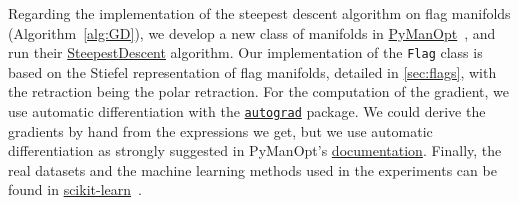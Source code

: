 Regarding the implementation of the steepest descent algorithm on flag manifolds (Algorithm~\ref{alg:GD}), we develop a new class of manifolds in \href{https://pymanopt.org/}{PyManOpt}~\citep{boumal_manopt_2014,townsend_pymanopt_2016}, and run their \href{https://github.com/pymanopt/pymanopt/blob/master/src/pymanopt/optimizers/steepest_descent.py}{SteepestDescent} algorithm. Our implementation of the \texttt{Flag} class is based on the Stiefel representation of flag manifolds, detailed in \autoref{sec:flags}, with the retraction being the polar retraction. For the computation of the gradient, we use automatic differentiation with the \texttt{\href{https://github.com/HIPS/autograd}{autograd}} package. We could derive the gradients by hand from the expressions we get, but we use automatic differentiation as strongly suggested in PyManOpt's \href{https://pymanopt.org/docs/stable/quickstart.html}{documentation}.
Finally, the real datasets and the machine learning methods used in the experiments can be found in \href{https://scikit-learn.org/stable/}{scikit-learn}~\citep{pedregosa_scikit-learn_2011}.




